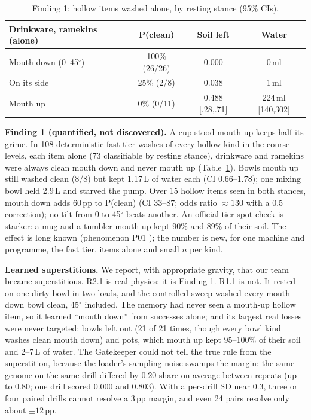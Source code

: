 \documentclass[9pt,twocolumn,letterpaper]{extarticle}
\begin{document}
\begin{table}[t]
\centering\footnotesize
\setlength{\tabcolsep}{3pt}
\begin{tabular}{@{}lccc@{}}
\toprule
Drinkware, ramekins (alone) & P(clean) & Soil left & Water \\
\midrule
Mouth down (0--45$^\circ$) & 100\% (26/26) & 0.000 & 0\,ml \\
On its side & 25\% (2/8) & 0.038 & 1\,ml \\
Mouth up & 0\% (0/11) & 0.488 [.28,.71] & 224\,ml [140,302] \\
\bottomrule
\end{tabular}
\caption{Finding 1: hollow items washed alone, by resting stance (95\% CIs).}
\label{tab:hollow}
\end{table}

\textbf{Finding 1 (quantified, not discovered).} A cup stood mouth up keeps half its grime. In 108
deterministic fast-tier washes of every hollow kind in the course levels, each item alone (73
classifiable by resting stance), drinkware and ramekins were
always clean mouth down and never mouth up (Table~\ref{tab:hollow}). Bowls mouth up still washed
clean (8/8) but kept 1.17\,L of water each (CI 0.66--1.78); one mixing bowl held 2.9\,L and starved
the pump. Over 15 hollow items seen in both stances, mouth down adds 60\,pp to P(clean) (CI
33--87; odds ratio ${\approx}130$ with a 0.5 correction); no tilt from 0 to 45$^\circ$ beats
another. An official-tier spot check is starker: a mug and a tumbler mouth up kept 90\% and 89\% of their
soil. The effect is long known (phenomenon P01 \citep{composo2026dishwasherbench}); the number
is new, for one machine and programme, the fast tier, items alone and small $n$ per kind.

\textbf{Learned superstitions.} We report, with appropriate gravity, that our team became
superstitious. R2.1 is real physics: it is Finding 1. R1.1 is not. It rested on one dirty bowl in
two loads, and the controlled sweep washed every mouth-down bowl clean, 45$^\circ$ included. The
memory had never seen a mouth-up hollow item, so it learned ``mouth down'' from successes alone;
and its largest real losses were never targeted: bowls left out (21 of 21 times, though every
bowl kind washes clean mouth down) and pots, which mouth up kept 95--100\% of their soil and 2--7\,L
of water. The Gatekeeper could not tell the true rule from the superstition,
because the loader's sampling noise swamps the margin: the same genome on the same drill differed
by 0.20 share on average between repeats (up to 0.80; one drill scored 0.000 and 0.803). With a
per-drill SD near 0.3, three or four paired drills cannot resolve a 3\,pp margin, and even 24
pairs resolve only about $\pm12$\,pp.
\end{document}
